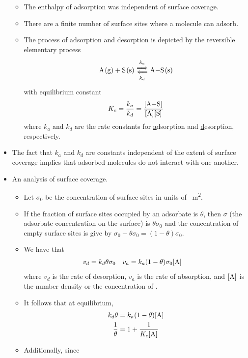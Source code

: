 \documentclass[../notes.tex]{subfiles}
\begin{document}
\begin{itemize}
\begin{itemize}
        \item The enthalpy of adsorption was independent of surface coverage.
        \item There are a finite number of surface sites where a molecule can adsorb.
        \item The process of adsorption and desorption is depicted by the reversible elementary process
        \begin{equation*}
            \ce{A(g) + S(s)} \Longleftrightarrows[k_a][k_d] \ce{A-S(s)}
        \end{equation*}
        with equilibrium constant
        \begin{equation*}
            K_c = \frac{k_a}{k_d}
            = \frac{\cnc{A-S}}{\cnc{A}\cnc{S}}
        \end{equation*}
        where $k_a$ and $k_d$ are the rate constants for \underline{a}dsorption and \underline{d}esorption, respectively.
    \end{itemize}
    \item The fact that $k_a$ and $k_d$ are constants independent of the extent of surface coverage implies that adsorbed molecules do not interact with one another.
    \item An analysis of surface coverage.
    \begin{itemize}
        \item Let $\sigma_0$ be the concentration of surface sites in units of \si{\per\meter\squared}.
        \item If the fraction of surface sites occupied by an adsorbate is $\theta$, then $\sigma$ (the adsorbate concentration on the surface) is $\theta\sigma_0$ and the concentration of empty surface sites is give by $\sigma_0-\theta\sigma_0=(1-\theta)\sigma_0$.
        \item We have that
        \begin{align*}
            v_d &= k_d\theta\sigma_0&
            v_a &= k_a(1-\theta)\sigma_0\cnc{A}
        \end{align*}
        where $v_d$ is the rate of desorption, $v_a$ is the rate of absorption, and $\cnc{A}$ is the number density or the concentration of .
        \item It follows that at equilibrium,
        \begin{align*}
            k_d\theta &= k_a(1-\theta)\cnc{A}\\
            \frac{1}{\theta} &= 1+\frac{1}{K_c\cnc{A}}
        \end{align*}
        \item Additionally, since

\end{itemize}
\end{itemize}
\end{document}
